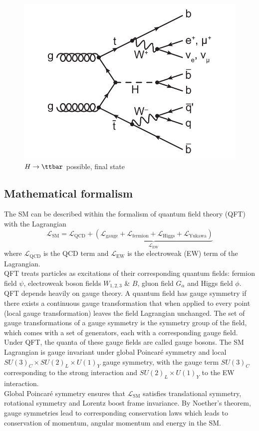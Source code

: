 \documentclass[../thesis.tex]{subfiles}
\begin{document}
\begin{figure}[!htbp]
\begin{center}
\includegraphics[width=0.7\linewidth]{fig/theory_tt_decay.pdf}
\caption[Caption]{\label{fig:theory:tt_decay}$H\rightarrow\ttbar$ possible, \tttt final state\citep{theory:ttH_Hbb}}
\end{center}
\end{figure}

\subsection{Mathematical formalism}
The \acs{SM} can be described within the formalism of quantum field theory (\acs{QFT}) with the Lagrangian
\begin{equation}
\mathcal{L}_\mathrm{SM} = \mathcal{L}_\mathrm{QCD} + {\underbrace{(\mathcal{L}_\mathrm{gauge}+\mathcal{L}_\mathrm{fermion}+\mathcal{L}_\mathrm{Higgs}+\mathcal{L}_\mathrm{Yukawa})}_{\mathcal{L}_\mathrm{EW}}}
\end{equation}
where $\mathcal{L}_\mathrm{QCD}$ is the \acs{QCD} term and $\mathcal{L}_\mathrm{EW}$ is the electroweak (\acs{EW}) term of the Lagrangian.\\
QFT treats particles as excitations of their corresponding quantum fields: fermion field $\psi$, electroweak boson fields $W_{1,2,3}$ \& $B$, gluon field $G_\alpha$ and Higgs field $\phi$.\\
\acs{QFT} depends heavily on gauge theory. A quantum field has gauge symmetry if there exists a continuous gauge transformation that when applied to every point (local gauge transformation) leaves the field Lagrangian unchanged. The set of gauge transformations of a gauge symmetry is the symmetry group of the field, which comes with a set of generators, each with a corresponding gauge field. Under \acs{QFT}, the quanta of these gauge fields are called gauge bosons.
The \acs{SM} Lagrangian is gauge invariant under global Poincar\'e symmetry and local $SU(3)_C \times SU(2)_L \times U(1)_Y$ gauge symmetry, with the gauge term $SU(3)_C$ corresponding to the strong interaction and $SU(2)_L \times U(1)_Y$ to the \acs{EW} interaction.\\
Global Poincar\'e symmetry ensures that $\mathcal{L}_\mathrm{SM}$ satisfies translational symmetry, rotational symmetry and Lorentz boost frame invariance. By Noether's theorem, gauge symmetries lead to corresponding conservation laws which leads to conservation of momentum, angular momentum and energy in the \acs{SM}.
\end{document}
